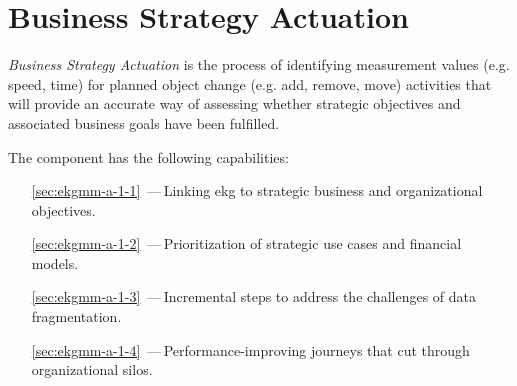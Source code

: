 \chapter{Business Strategy Actuation}\label{ch:ekg-mm-a-1}\label{ch:ekg-mm-business-strategy-actuation} %

\textit{Business Strategy Actuation} is the process of identifying measurement values (e.g. speed, time)
for planned object change (e.g. add, remove, move) activities that will provide an accurate way of
assessing whether strategic objectives and associated business goals have been fulfilled.

The  component has the following capabilities:

\begin{itemize}[leftmargin=.5in]
  \item [\ref{sec:ekgmm-a-1-1}] \,---\,Linking \gls{ekg} to strategic business and organizational objectives.
  \item [\ref{sec:ekgmm-a-1-2}] \,---\,Prioritization of strategic use cases and financial models.
  \item [\ref{sec:ekgmm-a-1-3}] \,---\,Incremental steps to address the challenges of data fragmentation.
  \item [\ref{sec:ekgmm-a-1-4}] \,---\,Performance-improving journeys that cut through organizational silos.
\end{itemize}





